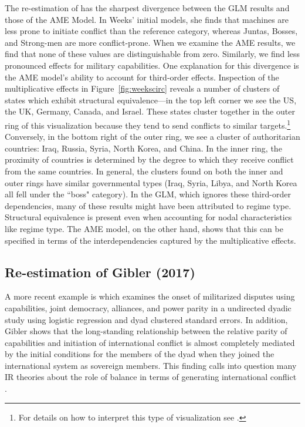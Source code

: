 \documentclass{article}[12pt]
\begin{document}
The re-estimation of \citet{weeks:2012} has the sharpest divergence between the GLM results and those of the AME Model. In Weeks' initial models,  she finds that machines are less prone to initiate conflict than the reference category, whereas Juntas, Bosses, and Strong-men are more conflict-prone. When we examine the AME results, we find that none of these values are distinguishable from zero. Similarly, we find less pronounced effects for military capabilities. One explanation for this divergence is the AME model's ability to account for third-order effects. Inspection of the multiplicative effects in Figure~\ref{fig:weekscirc} reveals a number of clusters of states which exhibit structural equivalence---in the top left corner we see the US, the UK, Germany, Canada, and Israel. These states cluster together in the outer ring of this visualization because they tend to send conflicts to similar targets.\footnote{For details on how to interpret this type of visualization see \citet{minhas:etal:2016:arxiv}.} Conversely, in the bottom right of the outer ring, we see a cluster of authoritarian countries: Iraq, Russia, Syria, North Korea, and China. In the inner ring, the proximity of countries is determined by the degree to which they receive conflict from the same countries. In general, the clusters found on both the inner and outer rings have similar governmental types (Iraq, Syria, Libya, and North Korea all fell under the ``boss" category). In the GLM, which ignores these third-order dependencies, many of these results might have been attributed to regime type. Structural equivalence is present even when accounting for nodal characteristics like regime type.  The AME model, on the other hand, shows that this can be specified in terms of the interdependencies captured by the multiplicative effects. 

\subsection{Re-estimation of Gibler (2017)}

A more recent example is \citet{gibler:2017} which examines the onset of militarized disputes using capabilities, joint democracy, alliances, and power parity in a undirected dyadic study using logistic regression and dyad clustered standard errors. In addition, Gibler shows that the long-standing relationship between the relative parity of capabilities and initiation of international conflict is almost completely mediated by the initial conditions for the members of the dyad when they joined the international system as sovereign members. This finding calls into question many IR theories about the role of balance in terms of generating international conflict \citep{organski:1958}.
\end{document}

